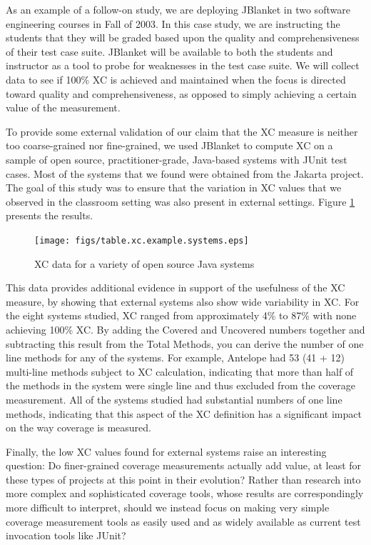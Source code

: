 \documentclass[10pt,twocolumn]{article}
\begin{document}
As an example of a follow-on study, we are deploying JBlanket in two
software engineering courses in Fall of 2003. In this case study, we are
instructing the students that they will be graded based upon the quality
and comprehensiveness of their test case suite. JBlanket will be available
to both the students and instructor as a tool to probe for weaknesses in
the test case suite. We will collect data to see if 100\% XC is achieved
and maintained when the focus is directed toward quality and
comprehensiveness, as opposed to simply achieving a certain value of the measurement.

\label{sec:OpenSource}

To provide some external validation of our claim that the XC measure is
neither too coarse-grained nor fine-grained, we used JBlanket to compute XC
on a sample of open source, practitioner-grade, Java-based systems with JUnit test cases.  Most
of the systems that we found were obtained from the Jakarta project.  The
goal of this study was to ensure that the variation in XC values that we
observed in the classroom setting was also present in external
settings. Figure \ref{fig:os-data} presents the results.

\begin{figure}[ht]
  \centering
  \texttt{[image: figs/table.xc.example.systems.eps]}
  \caption{XC data for a variety of open source Java systems}
  \label{fig:os-data}
\end{figure}

This data provides additional evidence in support of the usefulness of the
XC measure, by showing that external systems also show wide variability in
XC.  For the eight systems studied, XC ranged from approximately 4\% to
87\% with none achieving 100\% XC.  By adding the Covered and Uncovered
numbers together and subtracting this result from the Total Methods, you
can derive the number of one line methods for any of the systems. For
example, Antelope had 53 (41 + 12) multi-line methods subject to XC
calculation, indicating that more than half of the methods in the system
were single line and thus excluded from the coverage measurement.  All of
the systems studied had substantial numbers of one line methods, indicating
that this aspect of the XC definition has a significant impact on the
way coverage is measured.

Finally, the low XC values found for external systems raise an interesting
question: Do finer-grained coverage measurements actually add value, at least for
these types of projects at this point in their evolution? Rather than
research into more complex and sophisticated coverage tools, whose results
are correspondingly more difficult to interpret, should we instead focus on
making very simple coverage measurement tools as easily used and as widely
available as current test invocation tools like JUnit?
\end{document}
